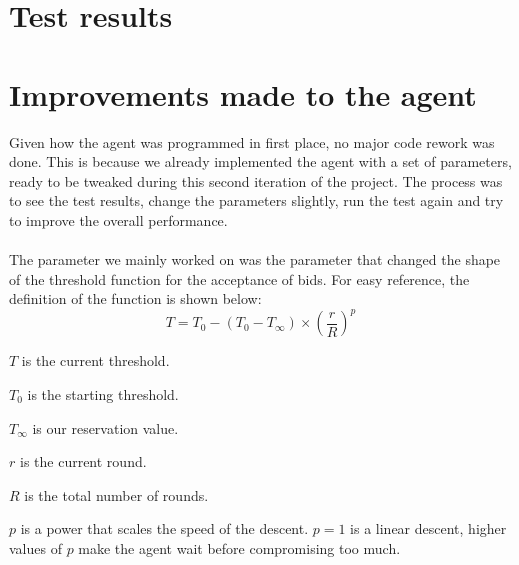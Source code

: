 \documentclass[a4,11pt]{scrartcl}
\let\tempone\itemize
\let\temptwo\enditemize
\renewenvironment{itemize}{\tempone\addtolength{\itemsep}{-0.5\baselineskip}}{\temptwo}
\begin{document}
\section{Test results}
\label{sec:testresults}



\section{Improvements made to the agent}
Given how the agent was programmed in first place, no major code rework was done. This is because we already implemented the agent with a set of parameters, ready to be tweaked during this second iteration of the project. The process was to see the test results, change the parameters slightly, run the test again and try to improve the overall performance.
\\ \\
The parameter we mainly worked on was the parameter that changed the shape of the threshold function for the acceptance of bids. For easy reference, the definition of the function is shown below:
\\
\begin{equation}
    T=T_{0}-(T_{0}-T_{\infty})\times\left(\frac{r}{R}\right)^{p}
\end{equation}
\begin{itemize}
    \item $T$ is the current threshold.
    \item $T_{0}$ is the starting threshold.
    \item $T_{\infty}$ is our reservation value.
    \item $r$ is the current round.
    \item $R$ is the total number of rounds.
    \item $p$ is a power that scales the speed of the descent. $p=1$ is
    a linear descent, higher values of $p$ make the agent wait before
    compromising too much.
\end{itemize}
\end{document}
